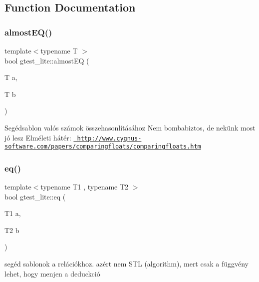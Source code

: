 \subsection{Function Documentation}
\mbox{\label{namespacegtest__lite_affbf9748c4e4dec6db137f7c147fee61}} 
\subsubsection{\texorpdfstring{almostEQ()}{almostEQ()}}
{\footnotesize\ttfamily template$<$typename T $>$ \\
bool gtest\+\_\+lite\+::almost\+EQ (\begin{DoxyParamCaption}\item[{T}]{a,  }\item[{T}]{b }\end{DoxyParamCaption})}

Segédsablon valós számok összehasonlításához Nem bombabiztos, de nekünk most jó lesz Elméleti hátér\+: \href{http://www.cygnus-software.com/papers/comparingfloats/comparingfloats.htm}{\texttt{ http\+://www.\+cygnus-\/software.\+com/papers/comparingfloats/comparingfloats.\+htm}} \mbox{\label{namespacegtest__lite_a884f0c7c25d80d78a73c759a8fc43a3d}} 
\subsubsection{\texorpdfstring{eq()}{eq()}}
{\footnotesize\ttfamily template$<$typename T1 , typename T2 $>$ \\
bool gtest\+\_\+lite\+::eq (\begin{DoxyParamCaption}\item[{T1}]{a,  }\item[{T2}]{b }\end{DoxyParamCaption})}

segéd sablonok a relációkhoz. azért nem S\+TL (algorithm), mert csak a függvény lehet, hogy menjen a deduckció \mbox{\label{namespacegtest__lite_aea477921e4c26d2a2806bc3011066270}} 
